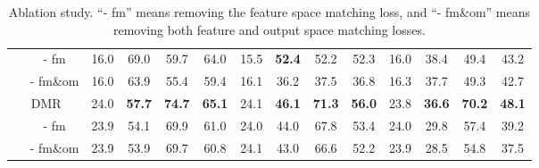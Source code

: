 \documentclass[letterpaper]{article} %
\begin{document}
\begin{table*}[!t]
\begin{tabular}{c|cccc|cccc|cccc}
~~ - fm                                 & 16.0 & 69.0          & 59.7          & 64.0                   & 15.5 & \textbf{52.4} & 52.2          & 52.3                   & 16.0 & 38.4          & 49.4          & 43.2          \\
~~ - fm\&om                           & 16.0 & 63.9          & 55.4          & 59.4                   & 16.1 & 36.2          & 37.5          & 36.8                   & 16.3 & 37.7          & 49.3          & 42.7          \\\hline
DMR                                        & 24.0 & \textbf{57.7} & \textbf{74.7} & \textbf{65.1}          & 24.1 & \textbf{46.1} & \textbf{71.3} & \textbf{56.0}          & 23.8 & \textbf{36.6} & \textbf{70.2} & \textbf{48.1} \\ 
~~ - fm                                 & 23.9 & 54.1          & 69.9          & 61.0                   & 24.0 & 44.0          & 67.8          & 53.4                   & 24.0 & 29.8          & 57.4          & 39.2          \\
~~ - fm\&om                           & 23.9 & 53.9          & 69.7          & 60.8                   & 24.1 & 43.0          & 66.6          & 52.2                   & 23.9 & 28.5          & 54.8          & 37.5          \\\hline
\end{tabular}
\caption{\normalsize Ablation study. ``- fm'' means removing the feature space matching loss, and ``- fm\&om'' means removing both feature and output space matching losses.}
\label{tab:ablation_study}
\end{table*}
\end{document}
